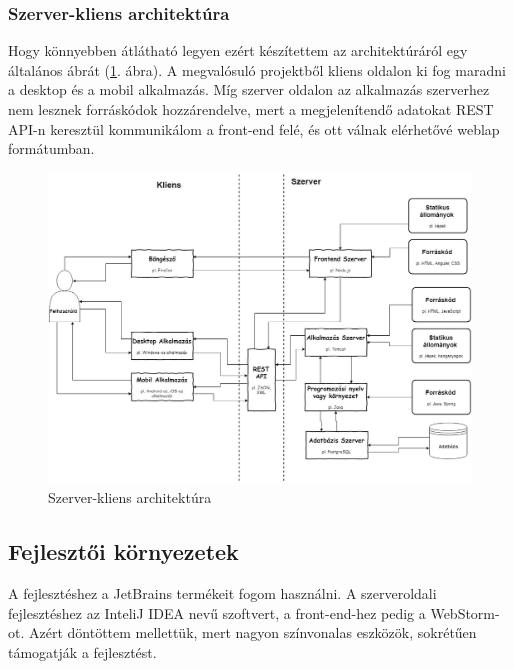 

\subsubsection{Szerver-kliens architektúra}

Hogy könnyebben átlátható legyen ezért készítettem az architektúráról egy általános ábrát (\ref{fig:architecture}. ábra). 
A megvalósuló projektből kliens oldalon ki fog maradni a desktop és a mobil alkalmazás. Míg szerver oldalon az alkalmazás szerverhez nem lesznek forráskódok hozzárendelve, mert a megjelenítendő adatokat REST API-n keresztül kommunikálom a front-end felé, és ott válnak elérhetővé weblap formátumban.

\begin{figure}
\centering
\includegraphics[scale=0.365]{kepek/architecture.jpg}
\caption{Szerver-kliens architektúra}
\label{fig:architecture}
\end{figure}

\subsection{Fejlesztői környezetek}

A fejlesztéshez a JetBrains termékeit fogom használni. A szerveroldali fejlesztéshez az InteliJ IDEA nevű szoftvert, a front-end-hez pedig a WebStorm-ot. Azért döntöttem mellettük, mert nagyon színvonalas eszközök, sokrétűen támogatják a fejlesztést.
 
